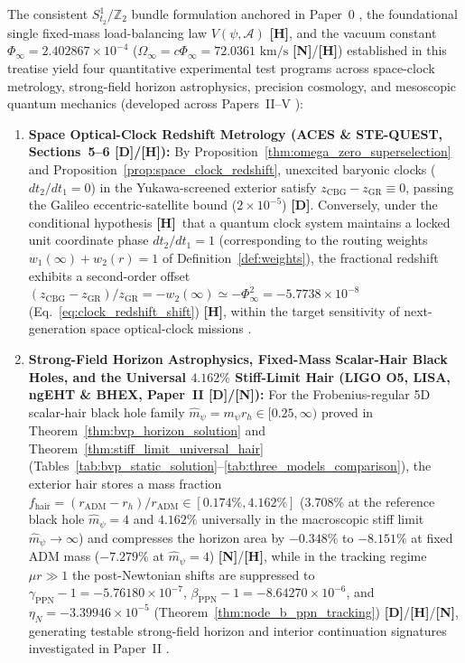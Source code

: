 \documentclass[11pt,a4paper]{article}
\newcommand{\catD}{\textbf{\textcolor{blue!75!black}{[D]}}}
\newcommand{\catH}{\textbf{\textcolor{orange!85!black}{[H]}}}
\newcommand{\catN}{\textbf{\textcolor{teal!75!black}{[N]}}}
\theoremstyle{definition}
\theoremstyle{remark}
\begin{document}
The consistent $S^1_{t_2}/\mathbb{Z}_2$ bundle formulation anchored in Paper~0 \cite{JV_Paper0}, the foundational single fixed-mass load-balancing law $V(\psi, \mathcal{A})$ \catH, and the vacuum constant $\Phi_{\infty} = 2.402867 \times 10^{-4}$ ($\Omega_{\infty} = c\Phi_{\infty} = 72.0361\text{ km/s}$ \catN/\catH) established in this treatise yield four quantitative experimental test programs across space-clock metrology, strong-field horizon astrophysics, precision cosmology, and mesoscopic quantum mechanics (developed across Papers~II--V \cite{JV_Paper2,JV_Paper3,JV_Paper4,JV_Paper5}):
\begin{enumerate}
  \item \textbf{Space Optical-Clock Redshift Metrology (ACES \& STE-QUEST, Sections~5--6 \catD/\catH):} By Proposition~\ref{thm:omega_zero_superselection} and Proposition~\ref{prop:space_clock_redshift}, unexcited baryonic clocks ($dt_2/dt_1 = 0$) in the Yukawa-screened exterior satisfy $z_{\text{CBG}} - z_{\text{GR}} \equiv 0$, passing the Galileo eccentric-satellite bound ($2 \times 10^{-5}$) \cite{Delva2018} \catD. Conversely, under the conditional hypothesis \catH\ that a quantum clock system maintains a locked unit coordinate phase $dt_2/dt_1 = 1$ (corresponding to the routing weights $w_1(\infty) + w_2(r) = 1$ of Definition~\ref{def:weights}), the fractional redshift exhibits a second-order offset $(z_{\text{CBG}} - z_{\text{GR}})/z_{\text{GR}} = -w_2(\infty) \simeq -\Phi_{\infty}^2 = -5.7738 \times 10^{-8}$ (Eq.~\ref{eq:clock_redshift_shift}) \catH, within the target sensitivity of next-generation space optical-clock missions \cite{ACES2009,STEQUEST2015}.
  \item \textbf{Strong-Field Horizon Astrophysics, Fixed-Mass Scalar-Hair Black Holes, and the Universal $4.162\%$ Stiff-Limit Hair (LIGO O5, LISA, ngEHT \& BHEX, Paper~II \cite{JV_Paper2} \catD/\catN):} For the Frobenius-regular 5D scalar-hair black hole family $\hat{m}_{\psi} = m_{\psi}r_h \in [0.25, \infty)$ proved in Theorem~\ref{thm:bvp_horizon_solution} and Theorem~\ref{thm:stiff_limit_universal_hair} (Tables~\ref{tab:bvp_static_solution}--\ref{tab:three_models_comparison}), the exterior hair stores a mass fraction $f_{\text{hair}} = (r_{\text{ADM}} - r_h)/r_{\text{ADM}} \in [0.174\%, 4.162\%]$ ($3.708\%$ at the reference black hole $\hat{m}_{\psi} = 4$ and $\mathbf{4.162\%}$ universally in the macroscopic stiff limit $\hat{m}_{\psi} \to \infty$) and compresses the horizon area by $-0.348\%$ to $\mathbf{-8.151\%}$ at fixed ADM mass ($-7.279\%$ at $\hat{m}_{\psi} = 4$) \catN/\catH, while in the tracking regime $\mu r \gg 1$ the post-Newtonian shifts are suppressed to $\gamma_{\text{PPN}} - 1 = -5.76180 \times 10^{-7}$, $\beta_{\text{PPN}} - 1 = -8.64270 \times 10^{-6}$, and $\eta_N = -3.39946 \times 10^{-5}$ (Theorem~\ref{thm:node_b_ppn_tracking}) \catD/\catH/\catN, generating testable strong-field horizon and interior continuation signatures investigated in Paper~II \cite{JV_Paper2}.

\end{enumerate}
\end{document}

